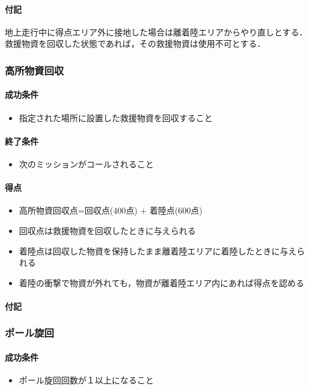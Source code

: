 \paragraph{付記}
地上走行中に得点エリア外に接地した場合は離着陸エリアからやり直しとする．救援物資を回収した状態であれば，その救援物資は使用不可とする．

\subsubsection{高所物資回収}
\paragraph{成功条件}
\begin{itemize}
\item 指定された場所に設置した救援物資を回収すること
\end{itemize}
\paragraph{終了条件}
\begin{itemize}
\item 次のミッションがコールされること
\end{itemize}
\paragraph{得点}
\begin{itemize}
\item 高所物資回収点=回収点(400点) + 着陸点(600点)
\item 回収点は救援物資を回収したときに与えられる
\item 着陸点は回収した物資を保持したまま離着陸エリアに着陸したときに与えられる
  \item 着陸の衝撃で物資が外れても，物資が離着陸エリア内にあれば得点を認める
\end{itemize}
\paragraph{付記}

\subsubsection{ポール旋回}
\paragraph{成功条件}
\begin{itemize}
\item ポール旋回回数が１以上になること
\end{itemize}
